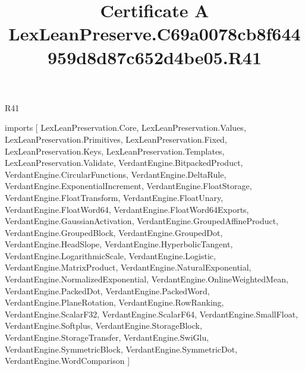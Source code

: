 \begin{lexlean}{R41}
\title{Certificate A LexLeanPreserve.C69a0078cb8f644959d8d87c652d4be05.R41}
\begin{coremodule}
imports [
  LexLeanPreservation.Core,
  LexLeanPreservation.Values,
  LexLeanPreservation.Primitives,
  LexLeanPreservation.Fixed,
  LexLeanPreservation.Keys,
  LexLeanPreservation.Templates,
  LexLeanPreservation.Validate,
  VerdantEngine.BitpackedProduct,
  VerdantEngine.CircularFunctions,
  VerdantEngine.DeltaRule,
  VerdantEngine.ExponentialIncrement,
  VerdantEngine.FloatStorage,
  VerdantEngine.FloatTransform,
  VerdantEngine.FloatUnary,
  VerdantEngine.FloatWord64,
  VerdantEngine.FloatWord64Exports,
  VerdantEngine.GaussianActivation,
  VerdantEngine.GroupedAffineProduct,
  VerdantEngine.GroupedBlock,
  VerdantEngine.GroupedDot,
  VerdantEngine.HeadSlope,
  VerdantEngine.HyperbolicTangent,
  VerdantEngine.LogarithmicScale,
  VerdantEngine.Logistic,
  VerdantEngine.MatrixProduct,
  VerdantEngine.NaturalExponential,
  VerdantEngine.NormalizedExponential,
  VerdantEngine.OnlineWeightedMean,
  VerdantEngine.PackedDot,
  VerdantEngine.PackedWord,
  VerdantEngine.PlaneRotation,
  VerdantEngine.RowRanking,
  VerdantEngine.ScalarF32,
  VerdantEngine.ScalarF64,
  VerdantEngine.SmallFloat,
  VerdantEngine.Softplus,
  VerdantEngine.StorageBlock,
  VerdantEngine.StorageTransfer,
  VerdantEngine.SwiGlu,
  VerdantEngine.SymmetricBlock,
  VerdantEngine.SymmetricDot,
  VerdantEngine.WordComparison
]


\end{coremodule}
\end{lexlean}
